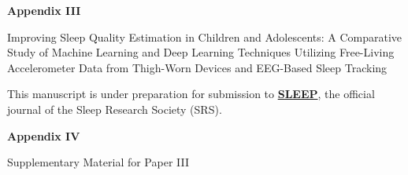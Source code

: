 \documentclass[
  10pt,
]{scrbook}
\begin{document}


\begin{center}

\textbf{\textsf{\Huge Appendix III}}



\vspace{2cm}

\textsf{\Huge Improving Sleep Quality Estimation in Children and Adolescents: A Comparative Study of Machine Learning and Deep Learning Techniques Utilizing Free-Living Accelerometer Data from Thigh-Worn Devices and EEG-Based Sleep Tracking}

\vspace{5cm}

This manuscript is under preparation for submission to \href{https://academic.oup.com/sleep}{\textbf{SLEEP}}, the official journal of the Sleep Research Society (SRS).

\vspace{1cm}

\end{center}



\begin{center}

\textbf{\textsf{\Huge Appendix IV}}



\vspace{1cm}

\textsf{\Huge Supplementary Material for Paper III}

\end{center}




\backmatter
\end{document}
